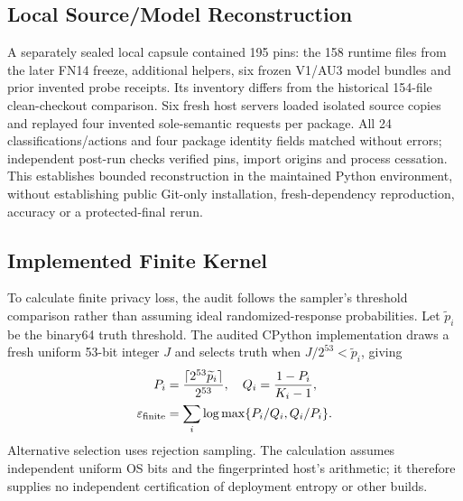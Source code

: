 \documentclass[conference]{IEEEtran}
\begin{document}
\subsection{Local Source/Model Reconstruction}
A separately sealed local capsule contained 195 pins: the 158 runtime files from the later FN14 freeze, additional helpers, six frozen V1/AU3 model bundles and prior invented probe receipts. Its inventory differs from the historical 154-file clean-checkout comparison. Six fresh host servers loaded isolated source copies and replayed four invented sole-semantic requests per package. All 24 classifications/actions and four package identity fields matched without errors; independent post-run checks verified pins, import origins and process cessation. This establishes bounded reconstruction in the maintained Python environment, without establishing public Git-only installation, fresh-dependency reproduction, accuracy or a protected-final rerun.


\subsection{Implemented Finite Kernel}
To calculate finite privacy loss, the audit follows the sampler's threshold comparison rather than assuming ideal randomized-response probabilities. Let $\widetilde p_i$ be the binary64 truth threshold. The audited CPython implementation draws a fresh uniform 53-bit integer $J$ and selects truth when $J/2^{53}<\widetilde p_i$, giving
\begin{equation}
\begin{aligned}
P_i&=\frac{\lceil2^{53}\widetilde p_i\rceil}{2^{53}},\quad Q_i=\frac{1-P_i}{K_i-1},\\
\varepsilon_{\rm finite}&=\sum_i\log\max\{P_i/Q_i,Q_i/P_i\}.
\end{aligned}
\end{equation}
Alternative selection uses rejection sampling. The calculation assumes independent uniform OS bits and the fingerprinted host's arithmetic; it therefore supplies no independent certification of deployment entropy or other builds.



\end{document}
